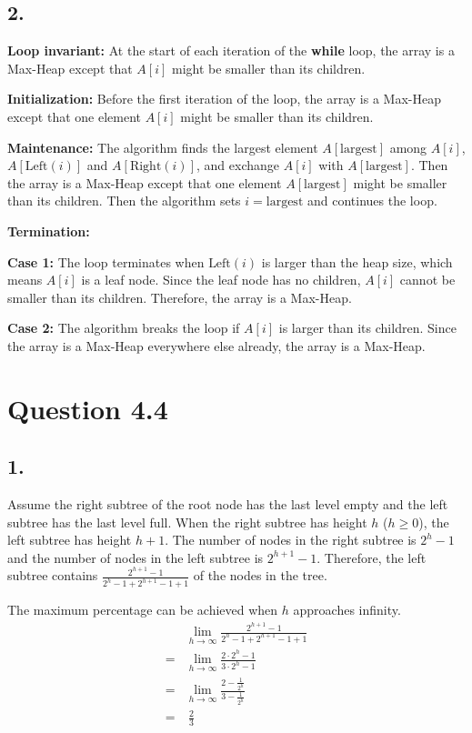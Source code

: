 \documentclass[a4paper,12pt]{article}
\begin{document}
\subsection*{2.}
\textbf{Loop invariant:} At the start of each iteration of the \textbf{while} loop, the array is a Max-Heap except that $A[i]$ might be smaller than its children.

\textbf{Initialization:} Before the first iteration of the loop, the array is a Max-Heap except that one element $A[i]$ might be smaller than its children.

\textbf{Maintenance:} The algorithm finds the largest element $A[\text{largest}]$ among $A[i]$, $A[\text{Left}(i)]$ and $A[\text{Right}(i)]$, and exchange $A[i]$ with $A[\text{largest}]$. 
Then the array is a Max-Heap except that one element $A[\text{largest}]$ might be smaller than its children.
Then the algorithm sets $i = \text{largest}$ and continues the loop.

\textbf{Termination:} 

\textbf{Case 1:} The loop terminates when $\text{Left}(i)$ is larger than the heap size, which means $A[i]$ is a leaf node.
Since the leaf node has no children, $A[i]$ cannot be smaller than its children.
Therefore, the array is a Max-Heap.

\textbf{Case 2:} The algorithm breaks the loop if $A[i]$ is larger than its children.
Since the array is a Max-Heap everywhere else already, the array is a Max-Heap.

\section*{Question 4.4}

\subsection*{1.}
Assume the right subtree of the root node has the last level empty and the left subtree has the last level full.
When the right subtree has height $h$ ($h \ge 0$), the left subtree has height $h+1$.
The number of nodes in the right subtree is $2^h - 1$ and the number of nodes in the left subtree is $2^{h+1} - 1$.
Therefore, the left subtree contains $\frac{2^{h+1} - 1}{2^h - 1 + 2^{h+1} - 1 + 1}$ of the nodes in the tree.

The maximum percentage can be achieved when $h$ approaches infinity.
\begin{align*}
	&\lim_{h \to \infty} \frac{2^{h+1} - 1}{2^h - 1 + 2^{h+1} - 1 + 1} \\
	= &\lim_{h \to \infty} \frac{2 \cdot 2^h - 1}{3 \cdot 2^h - 1} \\
	= &\lim_{h \to \infty} \frac{2 - \frac{1}{2^h}}{3 - \frac{1}{2^h}} \\
	= &\ \frac{2}{3}
\end{align*}
\end{document}
